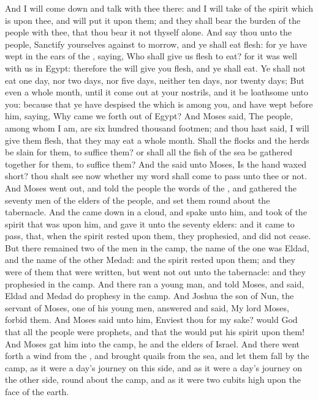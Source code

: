 \begin{biblechapter}
\verse And I will come down and talk with thee there: and I will take of the spirit which is upon thee, and will put it upon them; and they shall bear the burden of the people with thee, that thou bear it not thyself alone.
\verse And say thou unto the people, Sanctify yourselves against to morrow, and ye shall eat flesh: for ye have wept in the ears of the \LORD, saying, Who shall give us flesh to eat? for it was well with us in Egypt: therefore the \LORD will give you flesh, and ye shall eat.
\verse Ye shall not eat one day, nor two days, nor five days, neither ten days, nor twenty days;
\verse But even a whole month, until it come out at your nostrils, and it be loathsome unto you: because that ye have despised the \LORD which is among you, and have wept before him, saying, Why came we forth out of Egypt?
\verse And Moses said, The people, among whom I am, are six hundred thousand footmen; and thou hast said, I will give them flesh, that they may eat a whole month.
\verse Shall the flocks and the herds be slain for them, to suffice them? or shall all the fish of the sea be gathered together for them, to suffice them?
\verse And the \LORD said unto Moses, Is the \LORDs hand waxed short? thou shalt see now whether my word shall come to pass unto thee or not.
\verse And Moses went out, and told the people the words of the \LORD, and gathered the seventy men of the elders of the people, and set them round about the tabernacle.
\verse And the \LORD came down in a cloud, and spake unto him, and took of the spirit that was upon him, and gave it unto the seventy elders: and it came to pass, that, when the spirit rested upon them, they prophesied, and did not cease.
\verse But there remained two of the men in the camp, the name of the one was Eldad, and the name of the other Medad: and the spirit rested upon them; and they were of them that were written, but went not out unto the tabernacle: and they prophesied in the camp.
\verse And there ran a young man, and told Moses, and said, Eldad and Medad do prophesy in the camp.
\verse And Joshua the son of Nun, the servant of Moses, one of his young men, answered and said, My lord Moses, forbid them.
\verse And Moses said unto him, Enviest thou for my sake? would God that all the \LORDs people were prophets, and that the \LORD would put his spirit upon them!
\verse And Moses gat him into the camp, he and the elders of Israel.
\verse And there went forth a wind from the \LORD, and brought quails from the sea, and let them fall by the camp, as it were a day's journey on this side, and as it were a day's journey on the other side, round about the camp, and as it were two cubits high upon the face of the earth.

\end{biblechapter}

